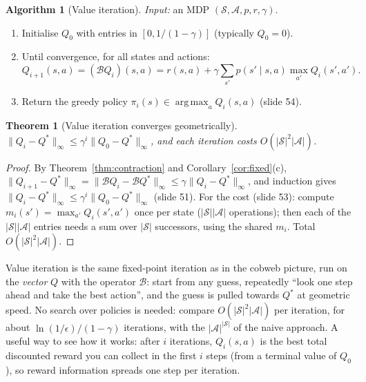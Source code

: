 \documentclass[11pt,a4paper]{article}
\newcommand{\cS}{\mathcal{S}}
\newcommand{\cA}{\mathcal{A}}
\newcommand{\Bell}{\mathcal{B}}
\newcommand{\norm}[1]{\lVert #1\rVert_\infty}
\DeclareMathOperator*{\argmax}{arg\,max}
\newcommand{\pdfnum}[1]{\setcounter{theorem}{\numexpr #1-1\relax}}
\theoremstyle{plain}
\newtheorem{theorem}{Theorem}
\theoremstyle{definition}
\newtheorem{algorithm}{Algorithm}\renewcommand{\thealgorithm}{\Alph{algorithm}}
\theoremstyle{remark}
\begin{document}
\begin{algorithm}[Value iteration]\label{alg:vi}
\emph{Input:} an MDP $(\cS,\cA,p,r,\gamma)$.\par
\begin{enumerate}[label=\arabic*.,leftmargin=*]
  \item Initialise $Q_0$ with entries in $[0,1/(1-\gamma)]$ (typically $Q_0=0$).
  \item Until convergence, for all states and actions:
  \[
  Q_{i+1}(s,a)=(\Bell Q_i)(s,a)=r(s,a)+\gamma\sum_{s'}p(s'\mid s,a)\max_{a'}Q_i(s',a').
  \]
  \item Return the greedy policy $\pi_i(s)\in\argmax_aQ_i(s,a)$ (slide 54).
\end{enumerate}
\end{algorithm}

\pdfnum{7}
\begin{theorem}[Value iteration converges geometrically]\label{thm:vi}
$\norm{Q_i-Q^*}\le\gamma^i\norm{Q_0-Q^*}$, and each iteration costs $O(|\cS|^2|\cA|)$.
\end{theorem}
\begin{proof}
By Theorem~\ref{thm:contraction} and Corollary~\ref{cor:fixed}(c), $\norm{Q_{i+1}-Q^*}=\norm{\Bell Q_i-\Bell Q^*}\le\gamma\norm{Q_i-Q^*}$, and induction gives $\norm{Q_i-Q^*}\le\gamma^i\norm{Q_0-Q^*}$ (slide 51). For the cost (slide 53): compute $m_i(s')=\max_{a'}Q_i(s',a')$ once per state ($|\cS||\cA|$ operations); then each of the $|\cS||\cA|$ entries needs a sum over $|\cS|$ successors, using the shared $m_i$. Total $O(|\cS|^2|\cA|)$.
\end{proof}

\begin{intuition}
Value iteration is the same fixed-point iteration as in the cobweb picture, run on the \emph{vector} $Q$ with the operator $\Bell$: start from any guess, repeatedly ``look one step ahead and take the best action'', and the guess is pulled towards $Q^*$ at geometric speed. No search over policies is needed: compare $O(|\cS|^2|\cA|)$ per iteration, for about $\ln(1/\epsilon)/(1-\gamma)$ iterations, with the $|\cA|^{|\cS|}$ of the naive approach. A useful way to see how it works: after $i$ iterations, $Q_i(s,a)$ is the best total discounted reward you can collect in the first $i$ steps (from a terminal value of $Q_0$), so reward information spreads one step per iteration.
\end{intuition}
\end{document}
